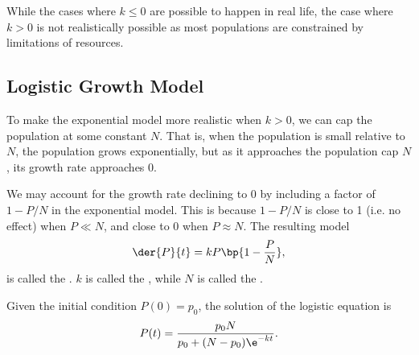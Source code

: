 \begin{figure}[H]
    \centering
    \caption{}
\end{figure}

While the cases where $k \leq 0$ are possible to happen in real life, the case where $k > 0$ is not realistically possible as most populations are constrained by limitations of resources.

\subsection{Logistic Growth Model}

To make the exponential model more realistic when $k > 0$, we can cap the population at some constant $N$. That is, when the population is small relative to $N$, the population grows exponentially, but as it approaches the population cap $N$, its growth rate approaches 0.

We may account for the growth rate declining to 0 by including a factor of $1 - P/N$ in the exponential model. This is because $1 - P/N$ is close to 1 (i.e. no effect) when $P \ll N$, and close to 0 when $P \approx N$. The resulting model \[\der{P}{t} = kP\bp{1 - \frac{P}{N}},\] is called the . $k$ is called the , while $N$ is called the .

Given the initial condition $P(0) = p_0$, the solution of the logistic equation is \[P(t) = \frac{p_0 N}{p_0 + (N-p_0) \e^{-kt}}.\]

